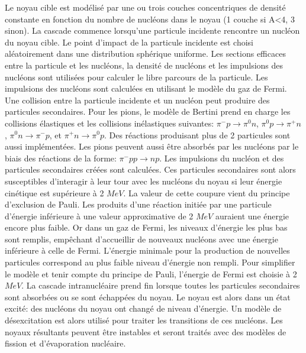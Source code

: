 Le noyau cible est modélisé par une ou trois couches concentriques de densité constante en fonction du nombre de nucléons dans le noyau (1 couche si A<4, 3 sinon). La cascade commence lorsqu'une particule incidente rencontre un nucléon du noyau cible. Le point d'impact de la particule incidente est choisi aléatoirement dans une distribution sphérique uniforme. Les sections efficaces entre la particule et les nucléons, la densité de nucléons et les impulsions des nucléons sont utilisées pour calculer le libre parcours de la particule. Les impulsions des nucléons sont calculées en utilisant le modèle du gaz de Fermi. Une collision entre la particule incidente et un nucléon peut produire des particules secondaires. Pour les pions, le modèle de Bertini prend en charge les collisions élastiques et les collisions inélastiques suivantes: $\pi^-p\rightarrow\pi^0n$, $\pi^0p\rightarrow\pi^+n$, $\pi^0n\rightarrow\pi^-p$, et $\pi^+n\rightarrow\pi^0p$. Des réactions produisant plus de 2 particules sont aussi implémentées. Les pions peuvent aussi être absorbés par les nucléons par le biais des réactions de la forme: $\pi^-pp\rightarrow np$. Les impulsions du nucléon et des particules secondaires créées sont calculées. Ces particules secondaires sont alors susceptibles d'interagir à leur tour avec les nucléons du noyau si leur énergie cinétique est supérieure à 2 $MeV$. La valeur de cette coupure vient du principe d'exclusion de Pauli. Les produits d'une réaction initiée par une particule d'énergie inférieure à une valeur approximative de 2 $MeV$ auraient une énergie encore plus faible. Or dans un gaz de Fermi, les niveaux d'énergie les plus bas sont remplis, empêchant d’accueillir de nouveaux nucléons avec une énergie inférieure à celle de Fermi. L'énergie minimale pour la production de nouvelles particules correspond au plus faible niveau d'énergie non rempli. Pour simplifier le modèle et tenir compte du principe de Pauli, l'énergie de Fermi est choisie à 2 $MeV$. La cascade intranucléaire prend fin lorsque toutes les particules secondaires sont absorbées ou se sont échappées du noyau. Le noyau est alors dans un état excité: des nucléons du noyau ont changé de niveau d'énergie. Un modèle de désexcitation est alors utilisé pour traiter les transitions de ces nucléons. Les noyaux résultants peuvent être instables et seront traités avec des modèles de fission et d'évaporation nucléaire.

